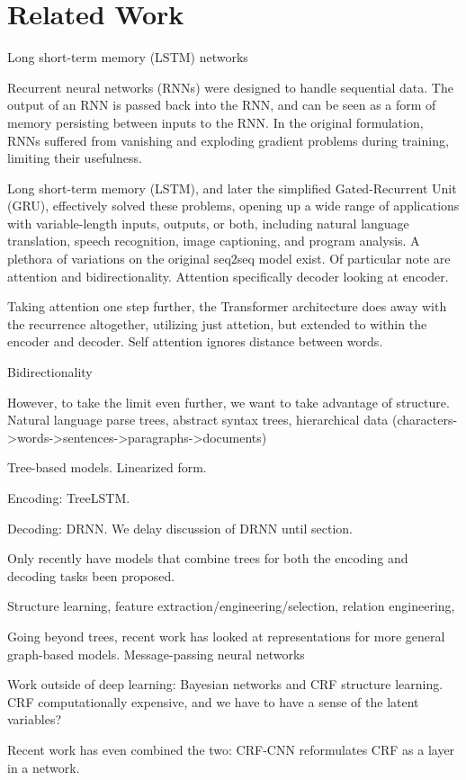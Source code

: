 \section{Related Work}\label{sec:related}

Long short-term memory (LSTM) 
networks~\citep{Hochreiter:1997:LSM:1246443.1246450}


Recurrent neural networks (RNNs) were designed to handle sequential data. The 
output of an RNN is passed back into the RNN, and can be seen as a form of 
memory persisting between inputs to the RNN\@. In the original formulation, RNNs 
suffered from vanishing and exploding gradient problems during training, 
limiting their usefulness.

Long short-term memory (LSTM), and later the simplified Gated-Recurrent Unit 
(GRU), effectively solved these problems, opening up a wide range of 
applications with variable-length inputs, outputs, or both,
including natural language translation, speech recognition, image captioning, 
and program analysis. A plethora of variations on the original seq2seq model 
exist. Of particular note are attention and bidirectionality.  Attention 
specifically decoder looking at encoder.

Taking attention one step further, the Transformer architecture does away with 
the recurrence altogether, utilizing just attetion, but extended to within the 
encoder and decoder.
Self attention ignores distance between words.

Bidirectionality

However, to take the limit even further, we want to take advantage of structure.  
Natural language parse trees, abstract syntax trees, hierarchical data 
(characters->words->sentences->paragraphs->documents)

Tree-based models. Linearized  form.

Encoding: TreeLSTM.

Decoding: DRNN. We delay discussion of DRNN until section.

Only recently have models that combine trees for both the encoding and decoding 
tasks been proposed.

Structure learning, feature extraction/engineering/selection, relation 
engineering,

Going beyond trees, recent work has looked at representations for more general 
graph-based models. Message-passing neural networks


Work outside of deep learning: Bayesian networks and CRF structure learning. CRF 
computationally expensive, and we have to have a sense of the latent variables?  

Recent work has even combined the two: CRF-CNN reformulates CRF as a layer in a 
network.

